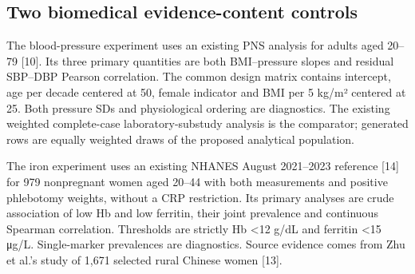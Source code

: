 \documentclass[11pt,letterpaper]{article}
\begin{document}
\FloatBarrier


\subsection{Two biomedical evidence-content controls}

The blood-pressure experiment uses an existing PNS analysis for adults aged 20–\allowbreak{}79 [10]. Its three primary quantities are both BMI–\allowbreak{}pressure slopes and residual SBP–\allowbreak{}DBP Pearson correlation. The common design matrix contains intercept, age per decade centered at 50, female indicator and BMI per 5 kg/\allowbreak{}m² centered at 25. Both pressure SDs and physiological ordering are diagnostics. The existing weighted complete-case laboratory-substudy analysis is the comparator; generated rows are equally weighted draws of the proposed analytical population.


The iron experiment uses an existing NHANES August 2021–\allowbreak{}2023 reference [14] for 979 nonpregnant women aged 20–\allowbreak{}44 with both measurements and positive phlebotomy weights, without a CRP restriction. Its primary analyses are crude association of low Hb and low ferritin, their joint prevalence and continuous Spearman correlation. Thresholds are strictly Hb <12 g/\allowbreak{}dL and ferritin <15 μg/\allowbreak{}L. Single-marker prevalences are diagnostics. Source evidence comes from Zhu et al.'s study of 1,671 selected rural Chinese women [13].


\FloatBarrier


\FloatBarrier

\begingroup

\small

\renewcommand{\arraystretch}{1.22}
\end{document}
